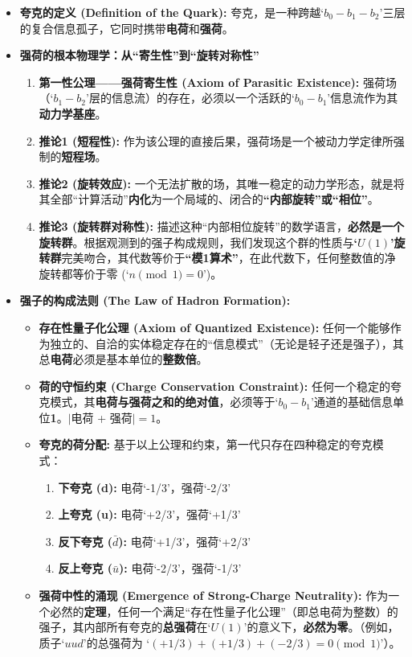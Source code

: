 \documentclass[12pt]{article}
\begin{document}
\begin{itemize}
    \item \textbf{夸克的定义 (Definition of the Quark):} 夸克，是一种跨越`$b_0-b_1-b_2$'三层的复合信息孤子，它同时携带\textbf{电荷}和\textbf{强荷}。
    
    \item \textbf{强荷的根本物理学：从``寄生性''到``旋转对称性''}
    \begin{enumerate}
        \item \textbf{第一性公理——强荷寄生性 (Axiom of Parasitic Existence):} 强荷场（`$b_1-b_2$'层的信息流）的存在，必须以一个活跃的`$b_0-b_1$'信息流作为其\textbf{动力学基座}。
        \item \textbf{推论1 (短程性):} 作为该公理的直接后果，强荷场是一个被动力学定律所强制的\textbf{短程场}。
        \item \textbf{推论2 (旋转效应):} 一个无法扩散的场，其唯一稳定的动力学形态，就是将其全部``计算活动''\textbf{内化}为一个局域的、闭合的\textbf{``内部旋转''或``相位''}。
        \item \textbf{推论3 (旋转群对称性):} 描述这种``内部相位旋转''的数学语言，\textbf{必然是一个旋转群}。根据观测到的强子构成规则，我们发现这个群的性质与\textbf{`$U(1)$'旋转群}完美吻合，其代数等价于\textbf{“模1算术”}，在此代数下，任何整数值的净旋转都等价于零 (`$n \pmod{1} = 0$')。
    \end{enumerate}
    
    \item \textbf{强子的构成法则 (The Law of Hadron Formation):}
    \begin{itemize}
        \item \textbf{存在性量子化公理 (Axiom of Quantized Existence):} 任何一个能够作为独立的、自洽的实体稳定存在的``信息模式''（无论是轻子还是强子），其总\textbf{电荷}必须是基本单位的\textbf{整数倍}。
        \item \textbf{荷的守恒约束 (Charge Conservation Constraint):} 任何一个稳定的夸克模式，其\textbf{电荷与强荷之和的绝对值}，必须等于`$b_0-b_1$'通道的基础信息单位\textbf{1}。$|$电荷 + 强荷$| = 1$。
        \item \textbf{夸克的荷分配:} 基于以上公理和约束，第一代只存在四种稳定的夸克模式：
        \begin{enumerate}
            \item \textbf{下夸克 (d):} 电荷`-1/3'，强荷`-2/3'
            \item \textbf{上夸克 (u):} 电荷`+2/3'，强荷`+1/3'
            \item \textbf{反下夸克 ($\bar{d}$):} 电荷`+1/3'，强荷`+2/3'
            \item \textbf{反上夸克 ($\bar{u}$):} 电荷`-2/3'，强荷`-1/3'
        \end{enumerate}
        \item \textbf{强荷中性的涌现 (Emergence of Strong-Charge Neutrality):} 作为一个必然的\textbf{定理}，任何一个满足``存在性量子化公理''（即总电荷为整数）的强子，其内部所有夸克的\textbf{总强荷}在`$U(1)$'的意义下，\textbf{必然为零}。（例如，质子`$uud$'的总强荷为 `$(+1/3) + (+1/3) + (-2/3) = 0 \pmod{1}$'）。
    \end{itemize}
    

\end{itemize}
\end{document}
